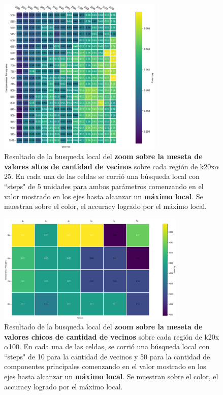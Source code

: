\begin{figure}[h]
    \includegraphics[width=0.7\textwidth]{./img/pca_zoom1_grid.png}
    \centering
    \caption{Resultado de la busqueda local del \textbf{zoom sobre la meseta de valores altos de cantidad de vecinos} sobre cada región de k20x$\alpha$25. En cada una de las celdas se corrió
    una búsqueda local con ``steps" de 5 unidades para ambos parámetros comenzando en el valor mostrado en los ejes
    hasta alcanzar un \textbf{máximo local}. Se muestran sobre el color, el accuracy logrado
    por el máximo local.}
    \label{fig:pca-z1}
\end{figure}

\begin{figure}[h]
    \includegraphics[width=0.8\textwidth]{./img/pca_zoom2_grid.png}
    \centering
    \caption{Resultado de la busqueda local del \textbf{zoom sobre la meseta de valores chicos de cantidad de vecinos} sobre cada región de k20x$\alpha$100. En cada una de las celdas, se corrió
    una búsqueda local con ``steps" de 10 para la cantidad de vecinos y 50 para la cantidad de componentes principales comenzando en el valor mostrado en los ejes
    hasta alcanzar un \textbf{máximo local}. Se muestran sobre el color, el accuracy logrado
    por el máximo local.}
    \label{fig:pca-z2}
\end{figure}

